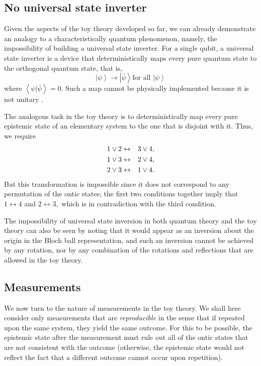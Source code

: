 \documentclass[pra,twocolumn,nofootinbib,showpacs]{revtex4}
\begin{document}
\subsection{No universal state inverter}

\label{nostateinverter}

Given the aspects of the toy theory developed so far, we can already
demonstrate an analogy to a characteristically quantum phenomenon, namely,
the impossibility of building a universal state inverter. For a single
qubit, a universal state inverter is a device that deterministically maps
every pure quantum state to the orthogonal quantum state, that is,
\begin{equation}
\left| \psi \right\rangle \rightarrow \left| \bar{\psi}\right\rangle \text{
for all }\left| \psi \right\rangle
\end{equation}
where $\left\langle \psi |\bar{\psi}\right\rangle =0.$ Such a map cannot be
physically implemented because it is not unitary \cite{nostateinverter}.

The analogous task in the toy theory is to deterministically map every pure
epistemic state of an elementary system to the one that is disjoint with it.
Thus, we require
\begin{eqnarray}
1\vee 2 &\leftrightarrow &3\vee 4,  \notag \\
1\vee 3 &\leftrightarrow &2\vee 4,  \notag \\
2\vee 3 &\leftrightarrow &1\vee 4.
\end{eqnarray}
But this transformation is impossible since it does not correspond to any
permutation of the ontic states; the first two conditions together imply
that $1\leftrightarrow 4$ and $2\leftrightarrow 3,$ which is in
contradiction with the third condition.

The impossibility of universal state inversion in both quantum theory and
the toy theory can also be seen by noting that it would appear as an
inversion about the origin in the Bloch ball representation, and such an
inversion cannot be achieved by any rotation, nor by any combination of the
rotations and reflections that are allowed in the toy theory.

\subsection{Measurements}

\label{measurements1}

\strut We now turn to the nature of measurements in the toy theory. We shall
here consider only measurements that are \emph{reproducible} in the sense
that if repeated upon the same system, they yield the same outcome. For this
to be possible, the epistemic state after the measurement must rule out all
of the ontic states that are not consistent with the outcome (otherwise, the
epistemic state would not reflect the fact that a different outcome cannot
occur upon repetition).
\end{document}
